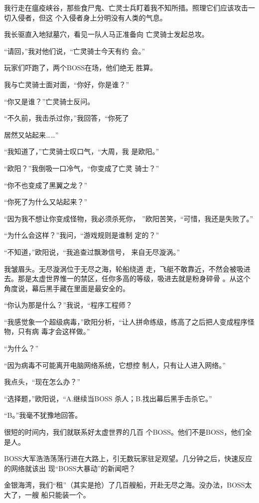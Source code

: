 \documentclass{article}
\begin{document}
我行走在瘟疫峡谷，那些食尸鬼、亡灵士兵盯着我不知所措。照理它们应该攻击一切入侵者，但这
个入侵者身上分明没有人类的气息。 

我长驱直入地狱墓穴，看见一队人马正准备向
亡灵骑士发起总攻。 

“请回，”我对他们说，“亡灵骑士今天有约
会。” 

玩家们吓跑了，两个BOSS在场，他们绝无
胜算。 


我与亡灵骑士面对面，“你好，你是谁？” 


“你又是谁？”亡灵骑士反问。 

“不久前，我击杀过你，”我回答，“你死了

\newpage
居然又站起来……” 

“我知道了，”亡灵骑士叹口气，“大周，我
是欧阳。” 

“欧阳？”我倒吸一口冷气，“你变成了亡灵
骑士？” 


“你不也变成了黑翼之龙？” 


“你死了为什么又站起来？” 

“因为我不想让你变成怪物，我必须杀死你，
”欧阳苦笑，“可惜，我还是失败了。” 

“为什么会这样？”我问，“游戏规则是谁制
定的？” 

“不知道，”欧阳说，“我追查过飘渺信号，
来自无尽漩涡。” 

我皱眉头。无尽漩涡位于无尽之海，轮船绕道
\newpage
走，飞艇不敢靠近，不然会被吸进去。那是太虚世界惟一的禁区，任你多高的等级，吸进去就是粉身碎骨
。从这个角度说，幕后黑手藏在里面是最安全的。 

“你认为那是什么？”我说，“程序工程师？

“我感觉象一个超级病毒，”欧阳分析，“让人拼命练级，练高了之后把人变成程序怪物，只有病
毒才会这样做。” 


“为什么？” 

“因为病毒不可能离开电脑网络系统，它想控
制人，只有让人进入网络。” 


我点头，“现在怎么办？” 

“选择题，”欧阳说，“A.继续当BOSS
杀人；B.找出幕后黑手击杀它。” 


\newpage

“B。”我毫不犹豫地回答。 

很短的时间内，我们就联系好太虚世界的几百
个BOSS。他们不是BOSS，他们全是人。 

BOSS大军浩浩荡荡行进在大路上，引无数玩家驻足观望。几分钟之后，快速反应的网络就该出
现“BOSS大暴动”的新闻吧？ 

金银海湾，我们“租”（其实是抢）了几百艘船，开赴无尽之海。没办法，BOSS太大了，一艘
船只能装一个。 
\end{document}
